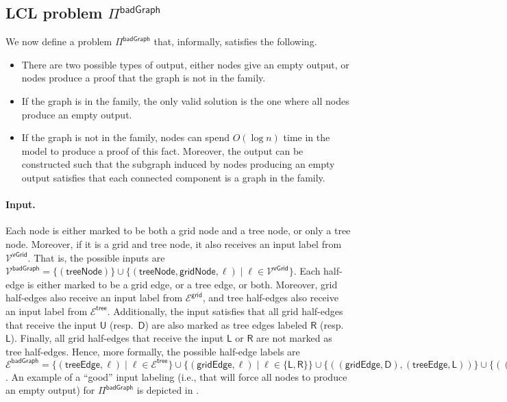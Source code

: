 \documentclass[11pt]{article}
\newcommand{\lleft}{\mathsf {L}}
\newcommand{\lright}{\mathsf {R}}
\newcommand{\lup}{\mathsf {U}}
\newcommand{\ldown}{\mathsf {D}}
\newcommand{\lgridedge}{\mathsf {gridEdge}}
\newcommand{\lgridnode}{\mathsf {gridNode}}
\newcommand{\ltreenode}{\mathsf {treeNode}}
\newcommand{\ltreeedge}{\mathsf {treeEdge}}
\newcommand{\lgrid}{\mathsf {grid}}
\newcommand{\lvgrid}{\mathsf {vGrid}}
\newcommand{\ltreelike}{\mathsf {tree}}
\newcommand{\lbadgraph}{\mathsf {badGraph}}
\begin{document}
\subsection{LCL problem \texorpdfstring{\boldmath$\Pi^{\lbadgraph}$}{Pi-badGraph}}

We now define a problem $\Pi^{\lbadgraph}$ that, informally, satisfies the following.
\begin{itemize}
	\item There are two possible types of output, either nodes give an empty output, or nodes produce a proof that the graph is not in the family.
	\item If the graph is in the family, the only valid solution is the one where all nodes produce an empty output.
	\item If the graph is not in the family, nodes can spend $O(\log n)$ time in the \local model to produce a proof of this fact. Moreover, the output can be constructed such that the subgraph induced by nodes producing an empty output satisfies that each connected component is a graph in the family.
\end{itemize}


\paragraph{Input.}
Each node is either marked to be both a grid node and a tree node, or only a tree node. Moreover, if it is a grid and tree node, it also receives an input label from $\mathcal{V}^{\lvgrid}$. That is, the possible inputs are $\mathcal{V^\lbadgraph} = \{ (\ltreenode)\} \cup \{(\ltreenode,\lgridnode,\ell) \mid  \ell \in \mathcal{V}^{\lvgrid}\}$. Each half-edge is either marked to be a grid edge, or a tree edge, or both. Moreover, grid half-edges also receive an input label from $\mathcal{E}^{\lgrid}$, and tree half-edges also receive an input label from $\mathcal{E}^{\ltreelike}$. Additionally, the input satisfies that all grid half-edges that receive the input $\lup$ (resp.\ $\ldown$) are also marked as tree edges labeled $\lright$ (resp.\ $\lleft$). Finally, all grid half-edges that receive the input $\lleft$ or $\lright$ are not marked as tree half-edges.
Hence, more formally, the possible half-edge labels are $\mathcal{E^\lbadgraph} = 
\{(\ltreeedge,\ell) \mid \ell \in \mathcal{E}^{\ltreelike}\} \cup 
\{(\lgridedge,\ell) \mid \ell \in  \{\lleft,\lright\}\} \cup
\{((\lgridedge,\ldown),(\ltreeedge,\lleft))\} \cup
\{((\lgridedge,\lup),(\ltreeedge,\lright))\}
$. An example of a ``good'' input labeling (i.e., that will force all nodes to produce an empty output) for $\Pi^{\lbadgraph}$ is depicted in .
\end{document}
